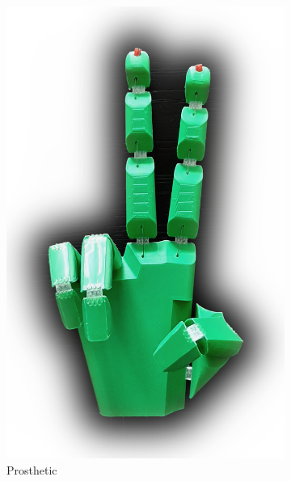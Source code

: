 \begin{figure}
\begin{subfigure}[B]{.3\columnwidth}
		\includegraphics[height=\figheight]{sources/applications/prosthetic.jpg}
		\caption{Prosthetic}
	\end{subfigure}
	\begin{subfigure}[B]{.3\columnwidth}
		\centering

\end{subfigure}
\end{figure}

